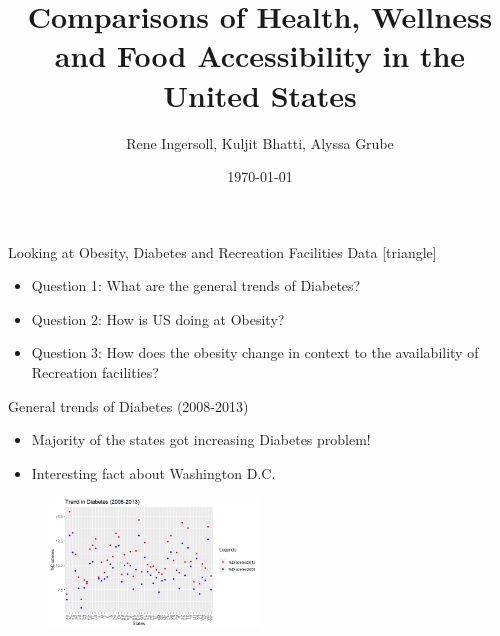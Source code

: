 \documentclass{beamer} %
\title[Comparisons of Health, Wellness and Food Accessibility in the United States]{Comparisons of Health, Wellness and Food Accessibility in the United States}
\institute[UNL]{University of Nebraska-Lincoln}
\author{Rene Ingersoll, Kuljit Bhatti, Alyssa Grube}
\date{\today}
\begin{document}


 

\begin{frame}

                \titlepage

\end{frame}

 


\begin{frame}{Looking at Obesity, Diabetes and Recreation Facilities Data}
  [triangle]

    \begin{itemize}
      \item Question 1: What are the general trends of Diabetes?
      \item Question 2: How is US doing at Obesity?
      \item Question 3: How does the obesity change in context to the availability of Recreation facilities?
    \end{itemize}

\end{frame}

\begin{frame}{General trends of Diabetes (2008-2013)}

  \begin{itemize}
    \item Majority of the states got increasing Diabetes problem!
    \item Interesting fact about Washington D.C.
  \end{itemize}
  \begin{figure}
    \includegraphics[width=0.5\textwidth]{DiaTrend.png}
    \hfill
  \end{figure}
\end{frame}

\end{document}
